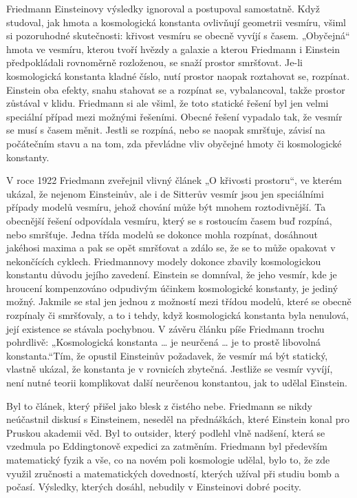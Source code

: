   Friedmann Einsteinovy výsledky ignoroval a postupoval samostatně. Když studoval, jak hmota a
  kosmologická konstanta ovlivňují geometrii vesmíru, všiml si pozoruhodné skutečnosti: křivost
  vesmíru se obecně vyvíjí s časem. „Obyčejná“ hmota ve vesmíru, kterou tvoří hvězdy a galaxie a
  kterou Friedmann i Einstein předpokládali rovnoměrně rozloženou, se snaží prostor smršťovat. Je-li
  kosmologická konstanta kladné číslo, nutí prostor naopak roztahovat se, rozpínat. Einstein oba
  efekty, snahu stahovat se a rozpínat se, vybalancoval, takže prostor zůstával v klidu. Friedmann
  si ale všiml, že toto statické řešení byl jen velmi speciální případ mezi možnými řešeními. Obecné
  řešení vypadalo tak, že vesmír se musí s časem měnit. Jestli se rozpíná, nebo se naopak smršťuje,
  závisí na počátečním stavu a na tom, zda převládne vliv obyčejné hmoty či kosmologické konstanty.
  
  V roce 1922 Friedmann zveřejnil vlivný článek „O křivosti prostoru“, ve kterém ukázal, že nejenom
  Einsteinův, ale i de Sitterův vesmír jsou jen speciálními případy modelů vesmíru, jehož chování
  může být mnohem roztodivnější. Ta obecnější řešení odpovídala vesmíru, který se s rostoucím časem
  buď rozpíná, nebo smršťuje. Jedna třída modelů se dokonce mohla rozpínat, dosáhnout jakéhosi
  maxima a pak se opět smršťovat a zdálo se, že se to může opakovat v nekončících cyklech.
  Friedmannovy modely dokonce zbavily kosmologickou konstantu důvodu jejího zavedení. Einstein se
  domníval, že jeho vesmír, kde je hroucení kompenzováno odpudivým účinkem kosmologické konstanty,
  je jediný možný. Jakmile se stal jen jednou z možností mezi třídou modelů, které se obecně
  rozpínaly či smršťovaly, a to i tehdy, když kosmologická konstanta byla nenulová, její existence
  se stávala pochybnou. V závěru článku píše Friedmann trochu pohrdlivě: „Kosmologická konstanta …
  je neurčená … je to prostě libovolná konstanta.“Tím, že opustil Einsteinův požadavek, že vesmír má
  být statický, vlastně ukázal, že konstanta je v rovnicích zbytečná. Jestliže se vesmír vyvíjí,
  není nutné teorii komplikovat další neurčenou konstantou, jak to udělal Einstein. 
  
  Byl to článek, který přišel jako blesk z čistého nebe. Friedmann se nikdy neúčastnil diskusí s
  Einsteinem, neseděl na přednáškách, které Einstein konal pro Pruskou akademii věd. Byl to
  outsider, který podlehl vlně nadšení, která se vzedmula po Eddingtonově expedici za zatměním.
  Friedmann byl především matematický fyzik a vše, co na novém poli kosmologie udělal, bylo to, že
  zde využil zručnosti a matematických dovedností, kterých užíval při studiu bomb a počasí.
  Výsledky, kterých dosáhl, nebudily v Einsteinovi dobré pocity. 
  
